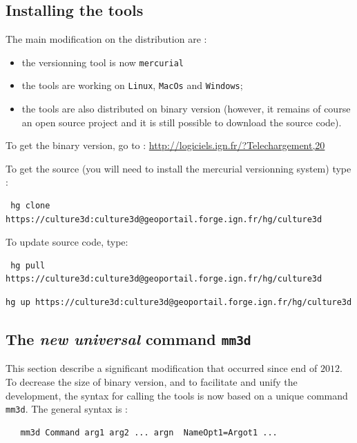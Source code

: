 \subsection{Installing the tools}
\label{Install}

The main modification on the distribution are :

\begin{itemize}
   \item  the versionning tool is now {\tt mercurial}
   \item  the tools are working on {\tt Linux}, {\tt MacOs} and  {\tt Windows};
   \item  the tools are also distributed on binary version (however, it remains of course
          an open source project and it is still possible to download the source code).
\end{itemize}

To get the binary version, go to : \url{http://logiciels.ign.fr/?Telechargement,20}


To get the source (you will need to install the mercurial versionning system) type :

\begin{verbatim}
 hg clone https://culture3d:culture3d@geoportail.forge.ign.fr/hg/culture3d
\end{verbatim}

To update source code, type:

\begin{verbatim}
 hg pull https://culture3d:culture3d@geoportail.forge.ign.fr/hg/culture3d
\end{verbatim}

\begin{verbatim}
hg up https://culture3d:culture3d@geoportail.forge.ign.fr/hg/culture3d
\end{verbatim}

\subsection{The \emph{new universal} command {\tt mm3d}}

This section describe a significant modification that occurred since end of $2012$. To decrease the
size of binary version, and to facilitate and unify the development, the syntax for calling the tools is now
based on a unique command {\tt mm3d}. The general syntax is :

\begin{verbatim}
   mm3d Command arg1 arg2 ... argn  NameOpt1=Argot1 ...
\end{verbatim}

